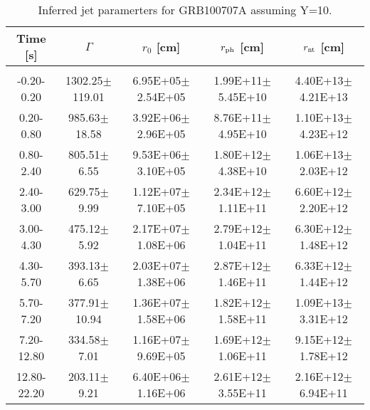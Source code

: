 \begin{table}[htp]
\scriptsize
\label{tab:}
\begin{tabular}{c c c c c}
Time [s] & $\Gamma$ & $r_0$ [cm] & $r_{\rm ph}$ [cm] & $r_{\rm nt}$ [cm] \\
\hline \hline\\ 

-0.20-0.20 & 1302.25$\pm$119.01 & 6.95E+05$\pm$2.54E+05 & 1.99E+11$\pm$5.45E+10 & 4.40E+13$\pm$4.21E+13 \\ 

0.20-0.80 & 985.63$\pm$18.58 & 3.92E+06$\pm$2.96E+05 & 8.76E+11$\pm$4.95E+10 & 1.10E+13$\pm$4.23E+12 \\ 

0.80-2.40 & 805.51$\pm$6.55 & 9.53E+06$\pm$3.10E+05 & 1.80E+12$\pm$4.38E+10 & 1.06E+13$\pm$2.03E+12 \\ 

2.40-3.00 & 629.75$\pm$9.99 & 1.12E+07$\pm$7.10E+05 & 2.34E+12$\pm$1.11E+11 & 6.60E+12$\pm$2.20E+12 \\ 

3.00-4.30 & 475.12$\pm$5.92 & 2.17E+07$\pm$1.08E+06 & 2.79E+12$\pm$1.04E+11 & 6.30E+12$\pm$1.48E+12 \\ 

4.30-5.70 & 393.13$\pm$6.65 & 2.03E+07$\pm$1.38E+06 & 2.87E+12$\pm$1.46E+11 & 6.33E+12$\pm$1.44E+12 \\ 

5.70-7.20 & 377.91$\pm$10.94 & 1.36E+07$\pm$1.58E+06 & 1.82E+12$\pm$1.58E+11 & 1.09E+13$\pm$3.31E+12 \\ 

7.20-12.80 & 334.58$\pm$7.01 & 1.16E+07$\pm$9.69E+05 & 1.69E+12$\pm$1.06E+11 & 9.15E+12$\pm$1.78E+12 \\ 

12.80-22.20 & 203.11$\pm$9.21 & 6.40E+06$\pm$1.16E+06 & 2.61E+12$\pm$3.55E+11 & 2.16E+12$\pm$6.94E+11 \\ 

\end{tabular}
\caption{Inferred jet paramerters for GRB100707A assuming Y=10.}
\end{table}
